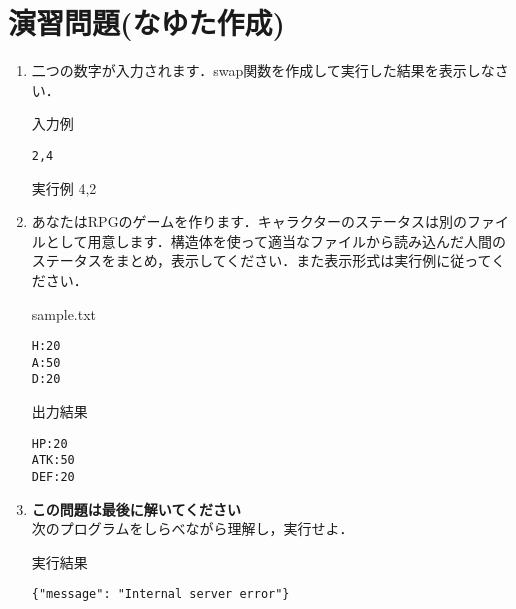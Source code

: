 \section{演習問題(なゆた作成)}
\begin{enumerate}
\item 二つの数字が入力されます．swap関数を作成して実行した結果を表示しなさい．
\begin{itembox}{入力例}
\begin{verbatim}
2,4
\end{verbatim}
\end{itembox}

\begin{itembox}{実行例}
4,2
\end{itembox}
\item あなたはRPGのゲームを作ります．キャラクターのステータスは別のファイルとして用意します．構造体を使って適当なファイルから読み込んだ人間のステータスをまとめ，表示してください．また表示形式は実行例に従ってください．
\begin{itembox}{sample.txt}
\begin{verbatim}
H:20
A:50
D:20
\end{verbatim}
\end{itembox}

\begin{itembox}{出力結果}
\begin{verbatim}
HP:20
ATK:50
DEF:20
\end{verbatim}
\end{itembox}

\item \textbf{この問題は最後に解いてください}\\次のプログラムをしらべながら理解し，実行せよ．

\begin{itembox}{実行結果}
\begin{verbatim}
{"message": "Internal server error"}
\end{verbatim}
\end{itembox}
\end{enumerate}